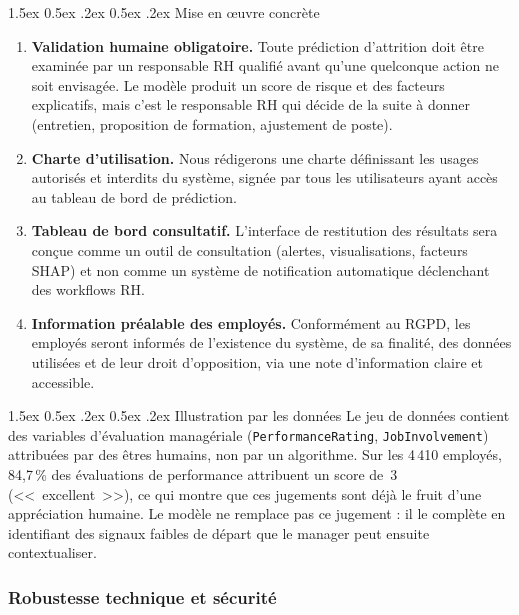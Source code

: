 \documentclass[12pt,a4paper]{article}
\makeatletter
\renewcommand\paragraph{\@startsection{paragraph}{4}{\z@}%
  {1.5ex \@plus 0.5ex \@minus .2ex}%
  {0.5ex \@plus .2ex}%
  {\normalfont\normalsize\bfseries}}
\makeatother
\begin{document}
\paragraph{Mise en \oe uvre concrète}
\begin{enumerate}
    \item \textbf{Validation humaine obligatoire.} Toute prédiction d'attrition doit être examinée par un responsable RH qualifié avant qu'une quelconque action ne soit envisagée. Le modèle produit un score de risque et des facteurs explicatifs, mais c'est le responsable RH qui décide de la suite à donner (entretien, proposition de formation, ajustement de poste).
    \item \textbf{Charte d'utilisation.} Nous rédigerons une charte définissant les usages autorisés et interdits du système, signée par tous les utilisateurs ayant accès au tableau de bord de prédiction.
    \item \textbf{Tableau de bord consultatif.} L'interface de restitution des résultats sera conçue comme un outil de consultation (alertes, visualisations, facteurs SHAP) et non comme un système de notification automatique déclenchant des workflows RH.
    \item \textbf{Information préalable des employés.} Conformément au RGPD, les employés seront informés de l'existence du système, de sa finalité, des données utilisées et de leur droit d'opposition, via une note d'information claire et accessible.
\end{enumerate}

\paragraph{Illustration par les données}
Le jeu de données contient des variables d'évaluation managériale (\texttt{PerformanceRating}, \texttt{JobInvolvement}) attribuées par des êtres humains, non par un algorithme. Sur les 4\,410 employés, 84,7\,\% des évaluations de performance attribuent un score de~3 (<<~excellent~>>), ce qui montre que ces jugements sont déjà le fruit d'une appréciation humaine. Le modèle ne remplace pas ce jugement : il le complète en identifiant des signaux faibles de départ que le manager peut ensuite contextualiser.

\subsubsection{Robustesse technique et sécurité}
\end{document}
